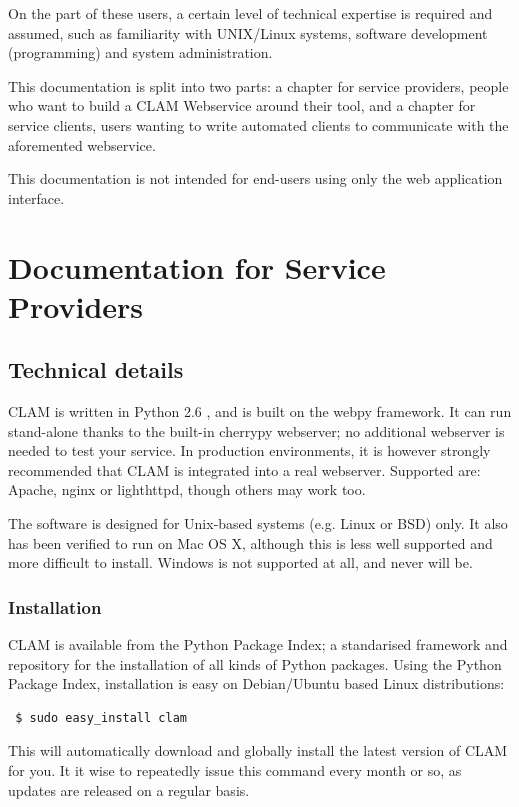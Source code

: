 \documentclass[a4paper,12pt]{report}
\begin{document}
On the part of these users, a certain level of technical expertise is required
and assumed, such as familiarity with UNIX/Linux systems, software development
(programming) and system administration.  

This documentation is split into two parts: a chapter for service providers,
people who want to build a CLAM Webservice around their tool, and a chapter for
service clients, users wanting to write automated clients to communicate with
the aforemented webservice.

This documentation is not intended for end-users using only the web application
interface. 

\chapter{Documentation for Service Providers}

\section{Technical details}

CLAM is written in Python 2.6 \cite{PYTHON}, and is built on the webpy framework. It can run
stand-alone thanks to the built-in cherrypy webserver; no additional webserver
is needed to test your service. In production environments, it is however
strongly recommended that CLAM is integrated into a real webserver. Supported
are: Apache, nginx or lighthttpd, though others may work too.

The software is designed for Unix-based systems (e.g. Linux or BSD) only. It
also has been verified to run on Mac OS X, although this is less well supported
and more difficult to install. Windows is not supported at all, and never will
be.

\subsection{Installation}

CLAM is available from the Python Package Index; a standarised framework and
repository for the installation of all kinds of Python packages. Using the
Python Package Index, installation is easy on Debian/Ubuntu based Linux
distributions:

\begin{verbatim} $ sudo easy_install clam \end{verbatim}

This will automatically download and globally install the latest version of
CLAM for you. It it wise to repeatedly issue this command every month or so, as
updates are released on a regular basis.
\end{document}

